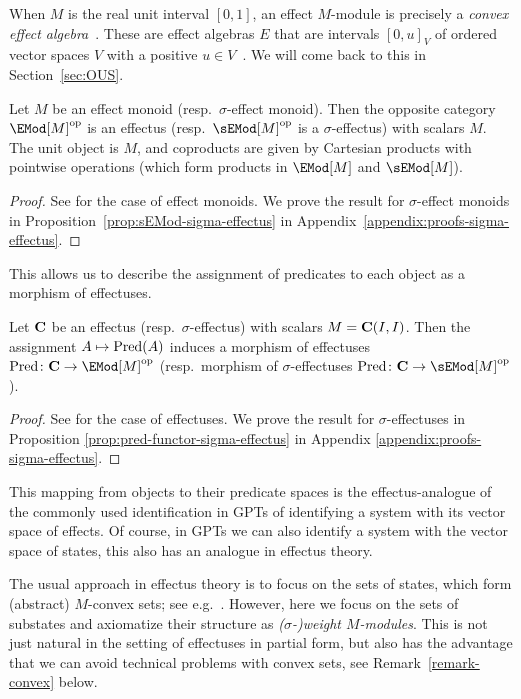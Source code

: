 \documentclass[%
	submission,
copyright,creativecommons,UKenglish]{eptcs}
\begin{document}
\begin{example}
    When $M$ is the real unit interval $[0,1]$, an effect $M$-module is precisely a \emph{convex effect algebra}~\cite{gudder1999convex}. These are effect algebras $E$ that are intervals $[0,u]_V$ of ordered vector spaces $V$ with a positive $u\in V$~\cite{gudder1998representation}.
We will come back to this in Section~\ref{sec:OUS}.
\end{example}

\begin{proposition}
\label{prop:emod-effectus}
Let $M$ be an effect monoid (resp.\ $\sigma$-effect monoid).
Then the opposite category
$\EMod[M]^{\opp}$
is an effectus
(resp.\ $\sEMod[M]^{\opp}$ is a $\sigma$-effectus)
with scalars $M$.
The unit object is $M$,
and coproducts are given by Cartesian products
with pointwise operations (which form products in
$\EMod[M]$ and $\sEMod[M]$).
\end{proposition}
\begin{proof}
See \cite[Proposition~3.4.10]{Cho2019PhD}
for the case of effect monoids.
We prove the result for $\sigma$-effect monoids
in Proposition~\ref{prop:sEMod-sigma-effectus}
in Appendix~\ref{appendix:proofs-sigma-effectus}.
\end{proof}

This allows us to describe the assignment
of predicates to each object as a morphism of effectuses.

\begin{proposition}
Let $\mathbf{C}$ be an effectus
(resp.\ $\sigma$-effectus) with scalars $M=\mathbf{C}(I,I)$.
Then the assignment $A\mapsto \mathrm{Pred}(A)$
induces a morphism of effectuses $\Pred\colon \catC\to\EMod[M]^{\opp}$
(resp.\ morphism of $\sigma$-effectuses
$\Pred\colon \catC\to\sEMod[M]^{\opp}$).
\end{proposition}
\begin{proof}
See \cite[Lemma~4.2.11]{Cho2019PhD}
for the case of effectuses.
We prove the result for $\sigma$-effectuses
in Proposition \ref{prop:pred-functor-sigma-effectus}
in Appendix \ref{appendix:proofs-sigma-effectus}.
\end{proof}
This mapping from objects to their predicate spaces is the effectus-analogue of the commonly used identification in GPTs of identifying a system with its vector space of effects. Of course, in GPTs we can also identify a system with the vector space of states, this also has an analogue in effectus theory.

The usual approach in effectus theory is to focus on the sets of states,
    which form (abstract) $M$-convex
    sets; see e.g.~\cite{cho2015introduction,jacobs2015new,basthesis}.
However, here we focus on
    the sets of substates
    and axiomatize their structure as
    \emph{($\sigma$-)weight $M$-modules}.
    This is not just natural in the setting of effectuses
    in partial form, but also has the advantage
    that we can avoid technical problems with
    convex sets, see Remark~\ref{remark-convex} below.
\end{document}
